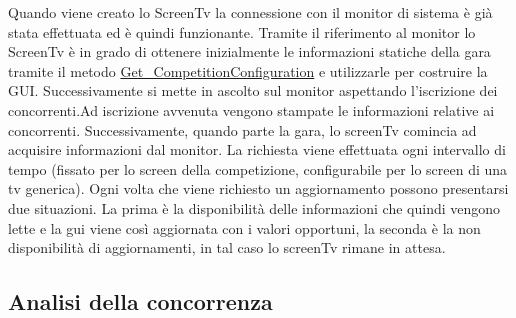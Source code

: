 \begin{center}
\begin{description}
Quando viene creato lo ScreenTv la connessione con il monitor di sistema \`{e} gi\`{a} stata effettuata ed \`{e} quindi funzionante. Tramite il riferimento al monitor lo ScreenTv \`{e} in grado di ottenere inizialmente le informazioni statiche della gara tramite il metodo \underline{Get\_CompetitionConfiguration} e utilizzarle per costruire la GUI. Successivamente si mette in ascolto sul monitor aspettando l'iscrizione dei concorrenti.Ad iscrizione avvenuta vengono stampate le informazioni relative ai concorrenti. Successivamente, quando parte la gara, lo screenTv comincia ad acquisire informazioni dal monitor. La richiesta viene effettuata ogni intervallo di tempo (fissato per lo screen della competizione, configurabile per lo screen di una tv generica). Ogni volta che viene richiesto un aggiornamento possono presentarsi due situazioni. La prima \`{e} la disponibilit\`{a} delle informazioni che quindi vengono lette e la gui viene cos\`{i} aggiornata con i valori opportuni, la seconda \`{e} la non disponibilit\`{a} di aggiornamenti, in tal caso lo screenTv rimane in attesa.
\end{description}
\end{center}
\subsection{Analisi della concorrenza}
